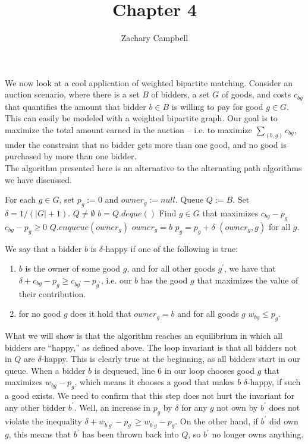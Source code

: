 \documentclass[11pt]{article}
\renewcommand{\'}{^{'}}
\renewcommand{\gets}{:=}
\newenvironment{definition}[2][Definition]{\begin{trivlist}
\item[\hskip \labelsep {\bfseries #1}\hskip \labelsep {\bfseries #2.}]}{\end{trivlist}}
\begin{document}
\title{Chapter 4}
\author{Zachary Campbell}

\maketitle
\doublespacing
We now look at a cool application of weighted bipartite matching. Consider an auction scenario, where 
there is a set $B$ of bidders, a set $G$ of goods, and costs $c_{bg}$ that quantifies the amount 
that bidder $b\in B$ is willing to pay for good $g\in G$. This can easily be modeled with a 
weighted bipartite graph. Our goal is to maximize the total amount earned in the auction -- i.e. to 
maximize $\sum_{(b,g)} c_{bg}$, under the constraint that no bidder gets more than one good, and no 
good is purchased by more than one bidder. \\
The algorithm presented here is an alternative to the alternating path algorithms we have discussed. 
\singlespace
\begin{codebox}
	\li For each $g\in G$, set $p_g \gets 0$ and $owner_g \gets null$.
	\li Queue $Q \gets B$.
	\li Set $\delta = 1/(|G| + 1)$.
	\li \While $Q\neq \emptyset$
		\Do
	\li		$b = Q.deque()$
	\li		Find $g\in G$ that maximizes $c_{bg} - p_{g}$
	\li		\If $c_{bg} - p_{g} \geq 0$
				\Then
	\li				$Q.enqueue(owner_g)$
	\li				$owner_g = b$
	\li				$p_g = p_g + \delta$
				\End
		\End
	\li \Return $(owner_g,g)$ for all $g$.
\end{codebox}
\doublespacing
\begin{definition}{}
	We say that a bidder $b$ is $\delta$-happy if one of the following is true:
	\begin{enumerate}
		\item $b$ is the owner of some good $g$, and for all other goods $g\'$, we have that 
			$\delta + c_{bg} - p_g \geq c_{bg\'} - p_{g\'}$, i.e. our $b$ has the good $g$ 
			that maximizes the value of their contribution.
		\item for no good $g$ does it hold that $owner_g = b$ and for all goods $g$ 
			$w_{bg} \leq p_g$.
	\end{enumerate}
\end{definition}

What we will show is that the algorithm reaches an equilibrium in which all bidders are ``happy,'' as 
defined above. The loop invariant is that all bidders not in $Q$ are $\delta$-happy. This is 
clearly true at the beginning, as all bidders start in our queue. When a bidder $b$ is dequeued, 
line $6$ in our loop chooses good $g$ that maximizes $w_{bg} - p_g$, which means it chooses a good 
that makes $b$ $\delta$-happy, if such a good exists. We need to confirm that this step does not 
hurt the invariant for any other bidder $b\'$. Well, an increase in $p_g$ by $\delta$ for any $g$ 
not own by $b\'$ does not violate the inequality $\delta + w_{b\' g\'} - p_{g\'} \geq w_{b\' g} - p_g$. 
On the other hand, if $b\'$ did own $g$, this means that $b\'$ has been thrown back into $Q$, so $b\'$ 
no longer owns anything.
\end{document}
